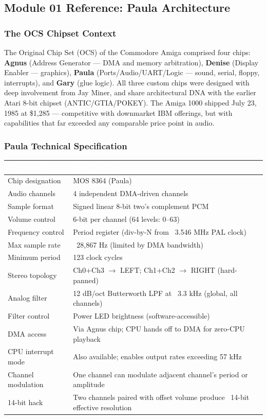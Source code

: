 \documentclass[11pt,letterpaper]{article}
\newcommand{\tableheader}[1]{\textbf{\sffamily\textcolor{white}{#1}}}
\begin{document}
\subsection{Module 01 Reference: Paula Architecture}

\subsubsection{The OCS Chipset Context}

The Original Chip Set (OCS) of the Commodore Amiga comprised four chips: \textbf{Agnus} (Address Generator --- DMA and memory arbitration), \textbf{Denise} (Display Enabler --- graphics), \textbf{Paula} (Ports/Audio/UART/Logic --- sound, serial, floppy, interrupts), and \textbf{Gary} (glue logic). All three custom chips were designed with deep involvement from Jay Miner, and share architectural DNA with the earlier Atari 8-bit chipset (ANTIC/GTIA/POKEY). The Amiga 1000 shipped July 23, 1985 at \$1,285 --- competitive with downmarket IBM offerings, but with capabilities that far exceeded any comparable price point in audio.

\subsubsection{Paula Technical Specification}

\begin{center}
\begin{tabularx}{\textwidth}{L{4cm}X}
\toprule
{}
\tableheader{Parameter} & \tableheader{Specification} \\
\midrule
Chip designation & MOS 8364 (Paula) \\
Audio channels & 4 independent DMA-driven channels \\
Sample format & Signed linear 8-bit two's complement PCM \\
Volume control & 6-bit per channel (64 levels: 0--63) \\
Frequency control & Period register (div-by-N from ~3.546 MHz PAL clock) \\
Max sample rate & ~28,867 Hz (limited by DMA bandwidth) \\
Minimum period & 123 clock cycles \\
Stereo topology & Ch0+Ch3 $\to$ LEFT; Ch1+Ch2 $\to$ RIGHT (hard-panned) \\
Analog filter & 12 dB/oct Butterworth LPF at ~3.3 kHz (global, all channels) \\
Filter control & Power LED brightness (software-accessible) \\
DMA access & Via Agnus chip; CPU hands off to DMA for zero-CPU playback \\
CPU interrupt mode & Also available; enables output rates exceeding 57 kHz \\
Channel modulation & One channel can modulate adjacent channel's period or amplitude \\
14-bit hack & Two channels paired with offset volume produce ~14-bit effective resolution \\
\bottomrule
\end{tabularx}
\end{center}
\end{document}
